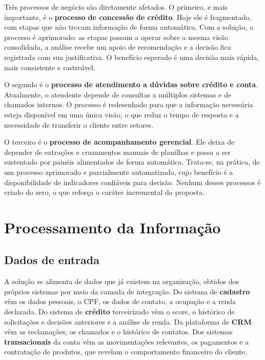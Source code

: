 \documentclass[12pt,a4paper]{article}
\begin{document}
Tr\^es processos de neg\'ocio s\~ao diretamente afetados. O primeiro, e mais importante, \'e o \textbf{processo de concess\~ao de cr\'edito}. Hoje ele \'e fragmentado, com etapas que n\~ao trocam informa\c{c}\~ao de forma autom\'atica. Com a solu\c{c}\~ao, o processo \'e aprimorado: as etapas passam a operar sobre a mesma vis\~ao consolidada, a an\'alise recebe um apoio de recomenda\c{c}\~ao e a decis\~ao fica registrada com sua justificativa. O benef\'icio esperado \'e uma decis\~ao mais r\'apida, mais consistente e rastre\'avel.

O segundo \'e o \textbf{processo de atendimento a d\'uvidas sobre cr\'edito e conta}. Atualmente, o atendente depende de consultas a m\'ultiplos sistemas e de chamados internos. O processo \'e redesenhado para que a informa\c{c}\~ao necess\'aria esteja dispon\'ivel em uma \'unica vis\~ao, o que reduz o tempo de resposta e a necessidade de transferir o cliente entre setores.

O terceiro \'e o \textbf{processo de acompanhamento gerencial}. Ele deixa de depender de extra\c{c}\~oes e cruzamentos manuais de planilhas e passa a ser sustentado por pain\'eis alimentados de forma autom\'atica. Trata-se, na pr\'atica, de um processo aprimorado e parcialmente automatizado, cujo benef\'icio \'e a disponibilidade de indicadores confi\'aveis para decis\~ao. Nenhum desses processos \'e criado do zero, o que refor\c{c}a o car\'ater incremental da proposta.

\section{Processamento da Informa\c{c}\~ao}

\subsection{Dados de entrada}

A solu\c{c}\~ao se alimenta de dados que j\'a existem na organiza\c{c}\~ao, obtidos dos pr\'oprios sistemas por meio da camada de integra\c{c}\~ao. Do sistema de \textbf{cadastro} v\^em os dados pessoais, o CPF, os dados de contato, a ocupa\c{c}\~ao e a renda declarada. Do sistema de \textbf{cr\'edito} terceirizado v\^em o score, o hist\'orico de solicita\c{c}\~oes e decis\~oes anteriores e a an\'alise de renda. Da plataforma de \textbf{CRM} v\^em as reclama\c{c}\~oes, os chamados e o hist\'orico de contatos. Dos sistemas \textbf{transacionais} da conta v\^em as movimenta\c{c}\~oes relevantes, os pagamentos e a contrata\c{c}\~ao de produtos, que revelam o comportamento financeiro do cliente.
\end{document}
